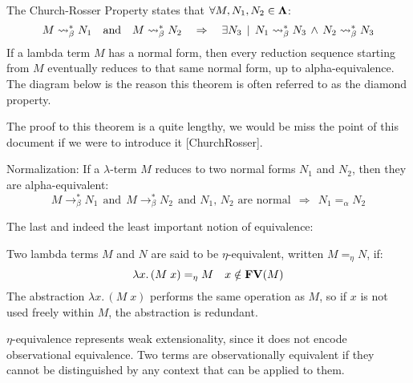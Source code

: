 \documentclass[12pt]{book}
\begin{document}
\begin{theorem} The Church-Rosser Property states that $\forall M, N_1, N_2 \in \mathbf{\Lambda}$:
  \[
    M \mathrel{\leadsto}_\beta^* N_1 \quad \text{and} \quad M \mathrel{\leadsto}_\beta^* N_2 \quad \Rightarrow \quad \exists N_3 \, \mid \, N_1 \mathrel{\leadsto}_\beta^* N_3 \,\wedge\, N_2 \mathrel{\leadsto}_\beta^* N_3
  \]
  If a lambda term $M$ has a normal form, then every reduction sequence starting from $M$ eventually reduces to that same normal form, up to alpha-equivalence. The diagram below is the reason this theorem is often referred to as the diamond property.
\begin{center}
\end{center}
The proof to this theorem is a quite lengthy, we would be miss the point
of this document if we were to introduce it [ChurchRosser].
\end{theorem}
\begin{corollary} Normalization: If a $\lambda$-term $M$ reduces to two normal forms $N_1$ and $N_2$, then they are alpha-equivalent:
\[
M \to_\beta^* N_1 \ \ \text{and} \ \ M \to_\beta^* N_2 \ \ \text{and $N_1$, $N_2$ are normal} \ \ \Rightarrow \ \ N_1 =_\alpha N_2
\]
\end{corollary}

The last and indeed the least important notion of equivalence:
\begin{definition} Two lambda terms \( M \) and \( N \) are said to be $\eta$-equivalent, written \( M =_\eta N \), if:
  \[
    \lambda x.\, (M\;x) =_\eta M \quad x \notin \mathbf{FV}(M) 
  \]
  The abstraction \( \lambda x.\, (M\;x) \) performs the same operation as \( M \), so if \( x \) is not used freely within \( M \), the abstraction is redundant.
\end{definition}
$\eta$-equivalence represents weak extensionality, since it does not encode observational equivalence. Two terms are observationally equivalent if they cannot be distinguished by any context that can be applied to them.
\end{document}
